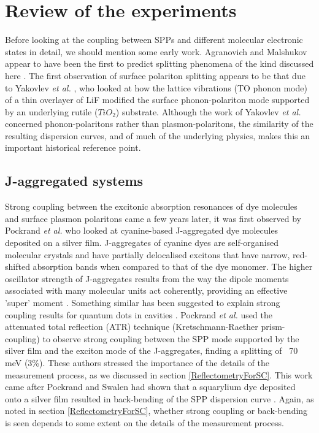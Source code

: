 \documentclass[12pt]{iopart}
\begin{document}
 


\section{Review of the experiments} \label{experiments}

Before looking at the coupling between SPPs and different molecular electronic states in detail, we should mention some early work. Agranovich and Malshukov appear to have been the first to predict splitting phenomena of the kind discussed here \cite{Agranovich1974}. The first observation of surface polariton splitting appears to be that due to Yakovlev {\it et al.} \cite{Yakovlev1975}, who looked at how the lattice vibrations (TO phonon mode) of a thin overlayer of LiF modified the surface phonon-polariton mode supported by an underlying rutile ($TiO_2$) substrate. Although the work of Yakovlev {\it et al.} concerned phonon-polaritons rather than plasmon-polaritons, the similarity of the resulting dispersion curves, and of much of the underlying physics, makes this an important historical reference point. 


\subsection{J-aggregated systems} \label{J-aggregates}

Strong coupling between the excitonic absorption resonances of dye molecules and surface plasmon polaritons came a few years later, it was first observed by Pockrand {\it et al.} \cite{Pockrand_JChemPhys_1982_77_6289} who looked at cyanine-based J-aggregated dye molecules deposited on a silver film. J-aggregates of cyanine dyes are self-organised molecular crystals and have partially delocalised excitons that have narrow, red-shifted absorption bands when compared to that of the dye monomer. The higher oscillator strength of J-aggregates results from the way the dipole moments associated with many molecular units act coherently, providing an effective 'super' moment \cite{Kobayashi_J-aggregates}. Something similar has been suggested to explain strong coupling results for quantum dots in cavities \cite{Marsden_NJP_2013_15_025013}. Pockrand {\it et al.} used the attenuated total reflection (ATR) technique (Kretschmann-Raether prism-coupling) to observe strong coupling between the SPP mode supported by the silver film and the exciton mode of the J-aggregates, finding a splitting of ~70 meV (3\%). These authors stressed the importance of the details of the measurement process, as we discussed in section \ref{ReflectometryForSC}. This work came after Pockrand and Swalen had shown that a squarylium dye deposited onto a silver film resulted in back-bending of the SPP dispersion curve \cite{Pockrand_JOSA_1978_68_1147}. Again, as noted in section \ref{ReflectometryForSC}, whether strong coupling or back-bending is seen depends to some extent on the details of the measurement process.
\end{document}
